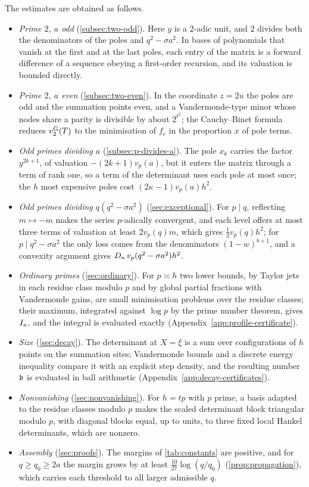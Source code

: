 The estimates are obtained as follows.
\begin{itemize}
\item \emph{Prime $2$, $a$ odd} (\cref{subsec:two-odd}). Here $y$ is a $2$-adic unit, and $2$
divides both the denominators of the poles and $q^2-\sigma a^2$. In bases of polynomials that
vanish at the first and at the last poles, each entry of the matrix is a forward difference of a
sequence obeying a first-order recursion, and its valuation is bounded directly.
\item \emph{Prime $2$, $a$ even} (\cref{subsec:two-even}). In the coordinate $z=2u$ the poles
are odd and the summation points even, and a Vandermonde-type minor whose nodes share a parity
is divisible by about $2^{t^2}$; the Cauchy--Binet formula reduces $v_{2}^{\mathrm{G}}(T)$ to the minimisation
of $f_e$ in the proportion $x$ of pole terms.
\item \emph{Odd primes dividing $a$} (\cref{subsec:p-divides-a}). The pole $x_k$ carries the
factor $y^{2k+1}$, of valuation $-(2k+1)v_p(a)$, but it enters the matrix through a term of rank
one, so a term of the determinant uses each pole at most once; the $h$ most expensive poles cost
$(2\kappa-1)v_p(a)h^2$.
\item \emph{Odd primes dividing $q(q^2-\sigma a^2)$} (\cref{sec:exceptional}). For $p\mid q$,
reflecting $m\mapsto-m$ makes the series $p$-adically convergent, and each level offers at most
three terms of valuation at least $2v_p(q)m$, which gives $\frac13v_p(q)h^2$; for
$p\mid q^2-\sigma a^2$ the only loss comes from the denominators $(1-w)^{b+1}$, and a convexity
argument gives $D_\kappa\,v_p(q^2-\sigma a^2)h^2$.
\item \emph{Ordinary primes} (\cref{sec:ordinary}). For $p\asymp h$ two lower bounds, by Taylor
jets in each residue class modulo $p$ and by global partial fractions with Vandermonde gains,
are small minimisation problems over the residue classes; their maximum, integrated against
$\log p$ by the prime number theorem, gives $I_\kappa$, and the integral is evaluated
exactly (Appendix~\ref{app:profile-certificate}).
\item \emph{Size} (\cref{sec:decay}). The determinant at $X=\xi$ is a sum over configurations
of $h$ points on the summation sites; Vandermonde bounds and a discrete energy inequality
compare it with an explicit step density, and the resulting number $\mathfrak{b}$ is evaluated in
ball arithmetic (Appendix~\ref{app:decay-certificates}).
\item \emph{Nonvanishing} (\cref{sec:nonvanishing}). For $h=tp$ with $p$ prime, a basis adapted
to the residue classes modulo $p$ makes the scaled determinant block triangular modulo $p$, with
diagonal blocks equal, up to units, to three fixed local Hankel determinants, which are
nonzero.
\item \emph{Assembly} (\cref{sec:proofs}). The margins of \cref{tab:constants} are positive,
and for $q\ge q_0\ge2a$ the margin grows by at least $\frac{10}{27}\log(q/q_0)$
(\cref{prop:propagation}), which carries each threshold to all larger admissible $q$.
\end{itemize}

